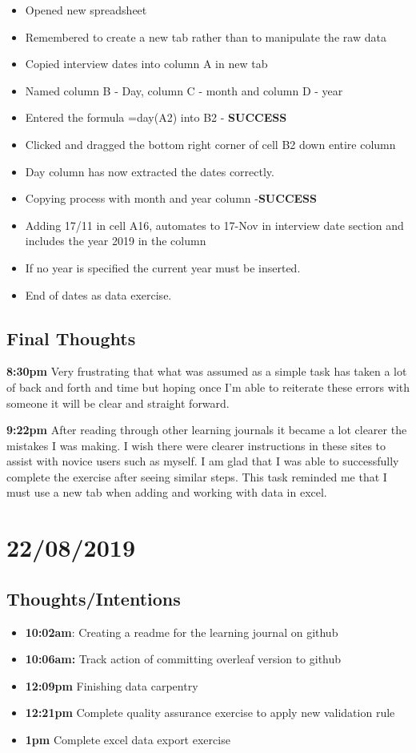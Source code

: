 \documentclass{article}
\begin{document}
\begin{itemize}
\item Opened new spreadsheet 
\item Remembered to create a new tab rather than to manipulate the raw data
\item Copied interview dates into column A in new tab
\item Named column B - Day, column C - month and column D - year
\item Entered the formula =day(A2) into B2 -\textbf{ SUCCESS}
\item Clicked and dragged the bottom right corner of cell B2 down entire column
\item Day column has now extracted the dates correctly.
\item Copying process with month and year column -\textbf{SUCCESS}
\item Adding 17/11 in cell A16, automates to 17-Nov in interview date section and includes the year 2019 in the column
\item If no year is specified the current year must be inserted.
\item End of dates as data exercise.

\end{itemize}

\subsection{Final Thoughts}
\textbf{8:30pm} Very frustrating that what was assumed as a simple task has taken a lot of back and forth and time but hoping once I'm able to reiterate these errors with someone it will be clear and straight forward. 


\textbf{9:22pm} After reading through other learning journals it became a lot clearer the mistakes I was making. I wish there were clearer instructions in these sites to assist with novice users such as myself. I am glad that I was able to successfully complete the exercise after seeing similar steps. This task reminded me that I must use a new tab when adding and working with data in excel. 

\section{22/08/2019}
\subsection{Thoughts/Intentions}
\begin{itemize}
\item \textbf{10:02am}: Creating a readme for the learning journal on github
\item \textbf{10:06am:} Track action of committing overleaf version to github
\item \textbf{12:09pm} Finishing data carpentry
\item \textbf{12:21pm} Complete quality assurance exercise to apply new validation rule
\item \textbf{1pm} Complete excel data export exercise
\end{itemize}
\end{document}
